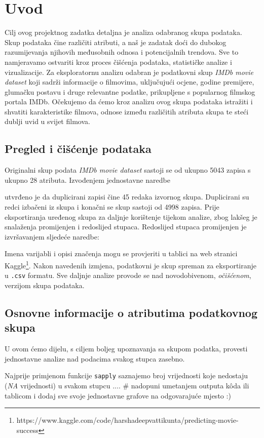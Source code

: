 

\chapter{Uvod}

	 Cilj ovog projektnog zadatka detaljna je analiza odabranog skupa podataka. Skup podataka čine različiti atributi, a naš je zadatak doći do dubokog razumijevanja njihovih međusobnih odnosa i potencijalnih trendova. Sve to namjeravamo ostvariti kroz proces čišćenja podataka, statističke analize i vizualizacije. Za eksploratornu analizu odabran je podatkovni skup \textit{IMDb movie dataset} koji sadrži informacije o filmovima, uključujući ocjene, godine premijere, glumačku postavu i druge relevantne podatke, prikupljene s popularnog filmskog portala IMDb. Očekujemo da ćemo kroz analizu ovog skupa podataka istražiti i shvatiti karakteristike filmova, odnose između različitih atributa skupa te steći dublji uvid u svijet filmova.
	 
	 \section{Pregled i čišćenje podataka}
	 
	 Originalni skup podata \textit{IMDb movie dataset} sastoji se od ukupno 5043 zapisa s ukupno 28 atributa. Izvođenjem jednostavne naredbe 
	 
	 
	 
	 \noindent utvrđeno je da duplicirani zapisi čine 45 redaka izvornog skupa. Duplicirani su redci izbačeni iz skupa i konačni se skup sastoji od 4998 zapisa. Prije eksportiranja uređenog skupa za daljnje korištenje tijekom analize, zbog lakšeg je snalaženja promijenjen i redoslijed stupaca. Redoslijed stupaca promijenjen je izvršavanjem sljedeće naredbe: 
	 
	 
	 
	 \noindent Imena varijabli i opisi značenja mogu se provjeriti u tablici na web stranici Kaggle\footnote{https://www.kaggle.com/code/harshadeepvattikunta/predicting-movie-success}. Nakon navedenih izmjena, podatkovni je skup spreman za eksportiranje u \texttt{.csv} formatu. Sve daljnje analize provode se nad novodobivenom, \textit{očišćenom}, verzijom skupa podataka.  
	 
	 
	 \section{Osnovne informacije o atributima podatkovnog \\ skupa}
	 
	 U ovom ćemo dijelu, s ciljem boljeg upoznavanja sa skupom podatka, provesti jednostavne analize nad podacima svakog stupca zasebno. 
	 
	 Najprije primjenom funkcije \texttt{sapply} saznajemo broj vrijednosti koje nedostaju (\textit{NA} vrijednosti) u svakom stupcu .... \# nadopuni umetanjem outputa kôda ili tablicom i dodaj sve svoje jednostavne grafove na odgovarajuće mjesto :)
	 
	 
	 
	 
	 
	 
	\eject